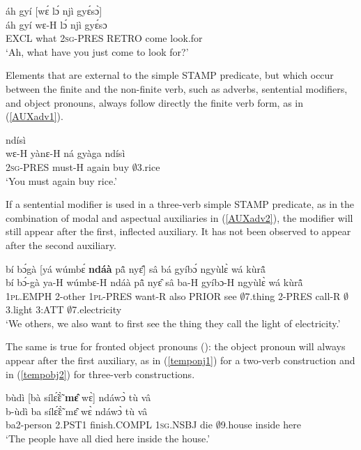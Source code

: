 \begin{exe} 
\ex\label{Compmax}
  \glll  áh gyí [wɛ́ lɔ́ njì gyɛ́sɔ̀] \\
        áh gyí wɛ-H lɔ́ njì gyɛ́sɔ \\
           EXCL what 2\textsc{sg}-PRES RETRO come look.for  \\
    \trans `Ah, what have you just come to look for?'
\end{exe}

Elements that are external to the simple STAMP predicate, but which occur between the finite and the non-finite verb, such as adverbs, sentential modifiers, and object pronouns, always follow directly the finite verb form, as in (\ref{AUXadv1}).

\begin{exe} 
\ex\label{AUXadv1} 
   ndísì \\
     wɛ-H yànɛ-H ná gyàga ndísì \\
        2\textsc{sg}-PRES must-H again buy $\emptyset$3.rice  \\
    \trans `You must again buy rice.'
\end{exe}

If a sentential modifier is used in a three-verb simple STAMP predicate, as in the combination of modal and aspectual auxiliaries in (\ref{AUXadv2}), the modifier will still appear after the first, inflected auxiliary. It has not been observed to appear after the second auxiliary.

\begin{exe} 
\ex\label{AUXadv2} 
  \glll  bí bɔ́gà [yá wúmbɛ́ {\bfseries ndáà} pã̂ nyɛ̂] sâ bá gyíbɔ́ ngyùlɛ̀ wá kùrã̂ \\
         bí bɔ́-gà ya-H wúmbɛ-H ndáà pã̂ nyɛ̂ sâ ba-H gyíbɔ-H ngyùlɛ̀ wá kùrã̂ \\
          1\textsc{pl}.EMPH 2-other 1\textsc{pl}-PRES want-R also PRIOR see $\emptyset$7.thing 2-PRES call-R $\emptyset$3.light 3:ATT $\emptyset$7.electricity  \\
    \trans `We others, we also want to first see the thing they call the light of electricity.'
\end{exe}

The same is true for fronted object pronouns (): the object pronoun will always appear after the first auxiliary, as in (\ref{temponj1}) for a two-verb construction and in (\ref{tempobj2}) for three-verb constructions.

\begin{exe} 
\ex\label{temponj1}
  \glll bùdì [bà sílɛ̃́ɛ̃̀ {\bfseries mɛ̂} wɛ̀] ndáwɔ̀ tù vâ\\
        b-ùdì ba sílɛ̃́ɛ̃̀ mɛ̂ wɛ̀ ndáwɔ̀ tù vâ \\
       ba2-person 2.PST1 finish.COMPL 1\textsc{sg}.NSBJ die $\emptyset$9.house inside here\\ 
    \trans `The people have all died here inside the house.'
\end{exe}

